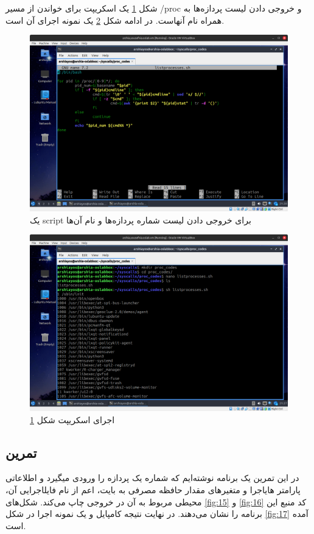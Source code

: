 \documentclass[12pt]{article}
\begin{document}
	شکل \ref{fig:13} یک اسکریپت برای خواندن از مسیر /proc و خروجی دادن لیست پردازه‌ها به همراه نام آنهاست. در ادامه شکل \ref{fig:14} یک نمونه اجرای آن است.
	\begin{figure}[H]
		\centering
		\includegraphics[width=\textwidth]{report3-resources/14.png}
		\caption{یک script برای خروجی دادن لیست شماره پردازه‌ها و نام آن‌ها}
		\label{fig:13}
	\end{figure}
	\begin{figure}[H]
		\centering
		\includegraphics[width=\textwidth]{report3-resources/15.png}
		\caption{اجرای اسکریپت شکل \ref{fig:13}}
		\label{fig:14}
	\end{figure}
	
	\subsection{تمرین}
	در این تمرین یک برنامه نوشته‌ایم که شماره یک پردازه را ورودی میگیرد و ‫اطلاعاتی‬ ‫اعم‬ ‫از‬ ‫نام‬
	‫فایل‬‫اجرایی‬ ‫آن‪،‬‬ ‫مقدار‬ ‫حافظه‬ ‫مصرفی‬ ‫به‬ ‫بایت‪،‬‬ ‫پارامتر‬ ‫های‬‫اجرا‬ ‫و‬ ‫متغیرهای‬ ‫محیطی‬ ‫مربوط‬ ‫به‬ ‫آن‬ ‫در‬ ‫خروجی‬ ‫چاپ‬ می‌کند. شکل‌های ‬‬\ref{fig:15} و \ref{fig:16} کد منبع این برنامه را نشان می‌دهند. در نهایت نتیجه کامپایل و یک نمونه اجرا در شکل \ref{fig:17} آمده است.
	
\end{document}

